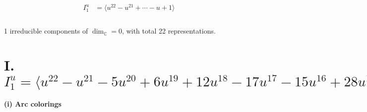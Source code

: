 \documentclass[1p]{elsarticle_modified}
\theoremstyle{definition}
\begin{document}
\begin{align*}
I^u_{1}&=\langle 
u^{22}- u^{21}+\cdots- u+1\rangle \\
\\
\end{align*}
\raggedright * 1 irreducible components of $\dim_{\mathbb{C}}=0$, with total 22 representations.\\
\newpage
\renewcommand{\arraystretch}{1}
\centering \section*{I. $I^u_{1}= \langle u^{22}- u^{21}-5 u^{20}+6 u^{19}+12 u^{18}-17 u^{17}-15 u^{16}+28 u^{15}+8 u^{14}-28 u^{13}+4 u^{12}+16 u^{11}-8 u^{10}-5 u^9+5 u^8+2 u^7- u^6-3 u^5+u^4+2 u^3- u+1 \rangle$}
\flushleft \textbf{(i) Arc colorings}\\
\end{document}
